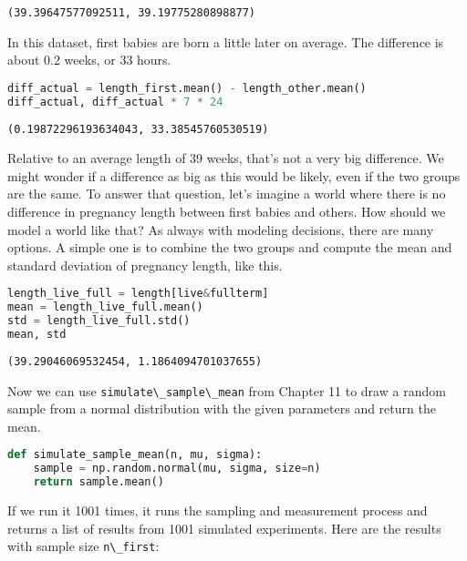\begin{lstlisting}[style=output]
(39.39647577092511, 39.19775280898877)
\end{lstlisting}

In this dataset, first babies are born a little later on average. The
difference is about 0.2 weeks, or 33 hours.

\begin{lstlisting}[language=Python,style=source]
diff_actual = length_first.mean() - length_other.mean()
diff_actual, diff_actual * 7 * 24
\end{lstlisting}

\begin{lstlisting}[style=output]
(0.19872296193634043, 33.38545760530519)
\end{lstlisting}

Relative to an average length of 39 weeks, that's not a very big
difference. We might wonder if a difference as big as this would be
likely, even if the two groups are the same. To answer that question,
let's imagine a world where there is no difference in pregnancy length
between first babies and others. How should we model a world like that?
As always with modeling decisions, there are many options. A simple one
is to combine the two groups and compute the mean and standard deviation
of pregnancy length, like this.

\begin{lstlisting}[language=Python,style=source]
length_live_full = length[live&fullterm]
mean = length_live_full.mean()
std = length_live_full.std()
mean, std
\end{lstlisting}

\begin{lstlisting}[style=output]
(39.29046069532454, 1.1864094701037655)
\end{lstlisting}

\pagebreak

Now we can use \passthrough{\lstinline!simulate\_sample\_mean!} from
Chapter 11 to draw a random sample from a normal distribution with the
given parameters and return the mean.

\begin{lstlisting}[language=Python,style=source]
def simulate_sample_mean(n, mu, sigma):
    sample = np.random.normal(mu, sigma, size=n)
    return sample.mean()
\end{lstlisting}

If we run it 1001 times, it runs the sampling and measurement process
and returns a list of results from 1001 simulated experiments. Here are
the results with sample size \passthrough{\lstinline!n\_first!}:

